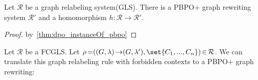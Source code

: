 


\begin{corollary}
    Let $\mathcal{R}$ be a graph relabeling system(GLS). There is a PBPO+ graph rewriting system $\mathcal{R}'$ and a homomorphism $h: \mathcal{R} \mathop{\to} \mathcal{R}'$.
\end{corollary}
\begin{proof}
    by~\autoref{thm:dpo_instanceOf_pbpo}
\end{proof}

Let $\mathcal{R}$ be a FCGLS. Let $\rho \mathop{=} ((G,\lambda) \mathop{\to} (G,\lambda'), \set{C_1,...,C_n}) \mathop{\in} \mathcal{R}$. We can translate this graph relabeling rule with forbidden contexts to a PBPO+ graph rewriting:

